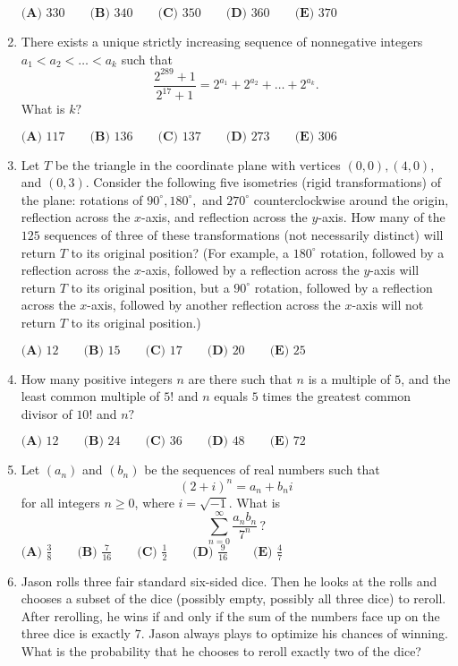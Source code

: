 \documentclass{article}%
\begin{document}
\begin{enumerate}
$\textbf{(A) } 330 \qquad \textbf{(B) } 340 \qquad \textbf{(C) } 350 \qquad \textbf{(D) } 360 \qquad \textbf{(E) } 370$

%
\item%
[\textbf{Problem 19}]There exists a unique strictly increasing sequence of nonnegative integers $a_1 < a_2 < … < a_k$ such that\[\frac{2^{289}+1}{2^{17}+1} = 2^{a_1} + 2^{a_2} + … + 2^{a_k}.\]What is $k?$

$\textbf{(A) } 117 \qquad \textbf{(B) } 136 \qquad \textbf{(C) } 137 \qquad \textbf{(D) } 273 \qquad \textbf{(E) } 306$

%
\item%
[\textbf{Problem 20}]Let $T$ be the triangle in the coordinate plane with vertices $(0,0), (4,0),$ and $(0,3).$ Consider the following five isometries (rigid transformations) of the plane: rotations of $90^{\circ}, 180^{\circ},$ and $270^{\circ}$ counterclockwise around the origin, reflection across the $x$-axis, and reflection across the $y$-axis. How many of the $125$ sequences of three of these transformations (not necessarily distinct) will return $T$ to its original position? (For example, a $180^{\circ}$ rotation, followed by a reflection across the $x$-axis, followed by a reflection across the $y$-axis will return $T$ to its original position, but a $90^{\circ}$ rotation, followed by a reflection across the $x$-axis, followed by another reflection across the $x$-axis will not return $T$ to its original position.)

$\textbf{(A) } 12 \qquad \textbf{(B) } 15 \qquad \textbf{(C) } 17 \qquad \textbf{(D) } 20 \qquad \textbf{(E) } 25$

%
\item%
[\textbf{Problem 21}]How many positive integers $n$ are there such that $n$ is a multiple of $5$, and the least common multiple of $5!$ and $n$ equals $5$ times the greatest common divisor of $10!$ and $n?$

$\textbf{(A) } 12 \qquad \textbf{(B) } 24 \qquad \textbf{(C) } 36 \qquad \textbf{(D) } 48 \qquad \textbf{(E) } 72$

%
\item%
[\textbf{Problem 22}]Let $(a_n)$ and $(b_n)$ be the sequences of real numbers such that
\[ (2 + i)^n = a_n + b_ni \]for all integers $n\geq 0$, where $i = \sqrt{-1}$. What is\[\sum_{n=0}^\infty\frac{a_nb_n}{7^n}\,?\]
$\textbf{(A) }\frac 38\qquad\textbf{(B) }\frac7{16}\qquad\textbf{(C) }\frac12\qquad\textbf{(D) }\frac9{16}\qquad\textbf{(E) }\frac47$

%
\item%
[\textbf{Problem 23}]Jason rolls three fair standard six-sided dice. Then he looks at the rolls and chooses a subset of the dice (possibly empty, possibly all three dice) to reroll. After rerolling, he wins if and only if the sum of the numbers face up on the three dice is exactly $7.$ Jason always plays to optimize his chances of winning. What is the probability that he chooses to reroll exactly two of the dice?


\end{enumerate}
\end{document}
